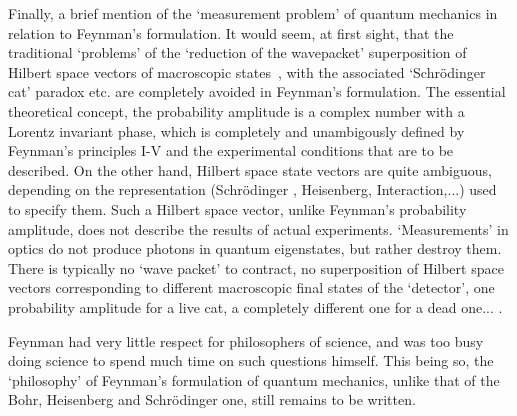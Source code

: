 {  \par Finally, a brief mention of the `measurement problem' of quantum mechanics in
   relation to Feynman's formulation. It would seem, at first sight, that the traditional 
  `problems' of the `reduction of the wavepacket' superposition of Hilbert space vectors of
    macroscopic states~\cite{Leggett}, with the associated `Schr\"{o}dinger cat' paradox etc. are completely avoided in 
    Feynman's formulation. The essential theoretical concept, the probability amplitude
    is a complex number with a Lorentz invariant phase,
    which is completely and unambigously defined by Feynman's principles I-V and
     the experimental conditions that are to be described. On the other hand, Hilbert
   space state vectors are quite ambiguous, depending on the representation
    (Schr\"{o}dinger , Heisenberg, Interaction,...) used to specify them.
     Such a Hilbert space vector, unlike Feynman's probability
    amplitude, does not describe the results of actual experiments. 
   `Measurements' in optics do not produce photons in quantum eigenstates, but rather
   destroy them. There is typically no `wave packet' to contract, no superposition
  of Hilbert space vectors corresponding to different macroscopic final states of the `detector',
  one probability amplitude for a live cat, a completely different one for a dead one... .
   \par Feynman had very little respect for philosophers of science, and was too busy 
   doing science to spend much time on such questions himself. This being so, the
  `philosophy' of Feynman's formulation of quantum mechanics, unlike that of
   the Bohr, Heisenberg and Schr\"{o}dinger one, still remains to be written.


   
}
